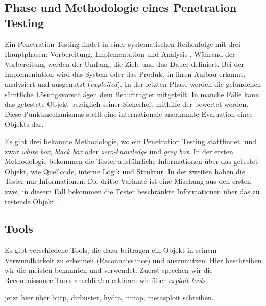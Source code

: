 \subsection{Phase und Methodologie eines Penetration Testing}

Ein Penetration Testing findet in einer systematischen Reihenfolge mit drei Hauptphasen: Vorbereitung, Implementation und Analysis \cite{Hessa_study_pentesting}. Während der Vorbereitung werden der Umfang, die Ziele und due Dauer definiert. Bei der Implementation wird das System oder das Produkt in ihren Aufbau erkannt, analysiert und ausgenutzt (\textit{exploited}). In der letzten Phase werden die gefundenen  sämtliche Lösungsvorschlägen dem Beauftragter mitgeteilt. In manche Fälle kann das getestete Objekt bezüglich seiner Sicherheit mithilfe der  bewertet werden. Diese Punktmechanismus stellt eine internationale anerkannte Evaluation eines Objekts dar. 

Es gibt drei bekannte Methodologie, wo ein Penetration Testing stattfindet, und zwar \textit{white box}, \textit{black box} oder \textit{zero-knowledge} und \textit{grey box}. In der ersten Methodologie bekommen die Tester ausführliche Informationen über das getestet Objekt, wie Quellcode, interne Logik und Struktur. In der zweiten haben die Tester nur  Informationen. Die dritte Variante ist eine Mischung aus den ersten zwei, in diesem Fall bekommen die Tester beschränkte Informationen über das zu testende Objekt \cite{Ehmer_methoden_testen}.

\subsection{Tools}

Es gibt verschiedene Tools, die dazu beitragen ein Objekt in seinem \gls{Verwundbarkeit} zu erkennen (Reconnaissance) und auszunutzen. Hier beschreiben wir die meisten bekannten und verwendet. Zuerst sprechen wir die Reconnaissance-Tools anschließen erklären wir über \textit{exploit-tools}.



jetzt hier über burp, dirbuster, hydra, nmap, metasploit schreiben.